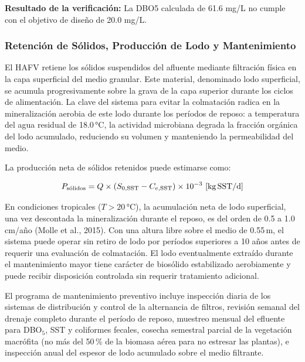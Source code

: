 \documentclass[12pt,a4paper]{article}
\begin{document}
\textbf{Resultado de la verificación:} La DBO5 calculada de 61.6 mg/L no cumple con el objetivo de diseño de 20.0 mg/L.

\subsubsection*{Retención de Sólidos, Producción de Lodo y Mantenimiento}

El HAFV retiene los sólidos suspendidos del afluente mediante filtración física en la capa superficial del medio granular. Este material, denominado lodo superficial, se acumula progresivamente sobre la grava de la capa superior durante los ciclos de alimentación. La clave del sistema para evitar la colmatación radica en la mineralización aerobia de este lodo durante los períodos de reposo: a temperatura del agua residual de 18.0\,°C, la actividad microbiana degrada la fracción orgánica del lodo acumulado, reduciendo su volumen y manteniendo la permeabilidad del medio.

La producción neta de sólidos retenidos puede estimarse como:

\begin{equation}
P_\text{sólidos} = Q \times (S_{0,\text{SST}} - C_{e,\text{SST}}) \times 10^{-3}\ \text{[kg\,SST/d]}
\end{equation}

En condiciones tropicales ($T > 20$\,°C), la acumulación neta de lodo superficial, una vez descontada la mineralización durante el reposo, es del orden de 0.5 a 1.0\,cm/año (Molle et al., 2015). Con una altura libre sobre el medio de 0.55\,m, el sistema puede operar sin retiro de lodo por períodos superiores a 10 años antes de requerir una evaluación de colmatación. El lodo eventualmente extraído durante el mantenimiento mayor tiene carácter de biosólido estabilizado aerobiamente y puede recibir disposición controlada sin requerir tratamiento adicional.

El programa de mantenimiento preventivo incluye inspección diaria de los sistemas de distribución y control de la alternancia de filtros, revisión semanal del drenaje completo durante el período de reposo, muestreo mensual del efluente para DBO$_5$, SST y coliformes fecales, cosecha semestral parcial de la vegetación macrófita (no más del 50\,\% de la biomasa aérea para no estresar las plantas), e inspección anual del espesor de lodo acumulado sobre el medio filtrante.
\end{document}
